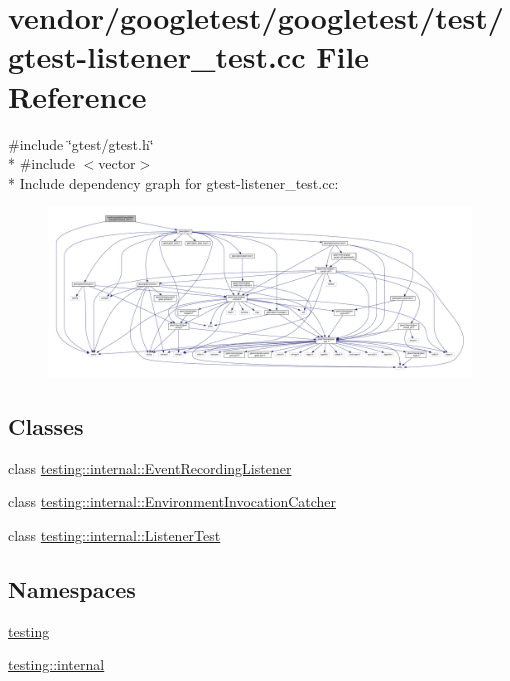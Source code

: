 \hypertarget{gtest-listener__test_8cc}{}\section{vendor/googletest/googletest/test/gtest-\/listener\+\_\+test.cc File Reference}
\label{gtest-listener__test_8cc}
{\ttfamily \#include \char`\"{}gtest/gtest.\+h\char`\"{}}\\*
{\ttfamily \#include $<$vector$>$}\\*
Include dependency graph for gtest-\/listener\+\_\+test.cc\+:
\nopagebreak
\begin{figure}[H]
\begin{center}
\leavevmode
\includegraphics[width=350pt]{gtest-listener__test_8cc__incl}
\end{center}
\end{figure}
\subsection*{Classes}
\begin{DoxyCompactItemize}
\item 
class \hyperlink{classtesting_1_1internal_1_1EventRecordingListener}{testing\+::internal\+::\+Event\+Recording\+Listener}
\item 
class \hyperlink{classtesting_1_1internal_1_1EnvironmentInvocationCatcher}{testing\+::internal\+::\+Environment\+Invocation\+Catcher}
\item 
class \hyperlink{classtesting_1_1internal_1_1ListenerTest}{testing\+::internal\+::\+Listener\+Test}
\end{DoxyCompactItemize}
\subsection*{Namespaces}
\begin{DoxyCompactItemize}
\item 
 \hyperlink{namespacetesting}{testing}
\item 
 \hyperlink{namespacetesting_1_1internal}{testing\+::internal}
\end{DoxyCompactItemize}
